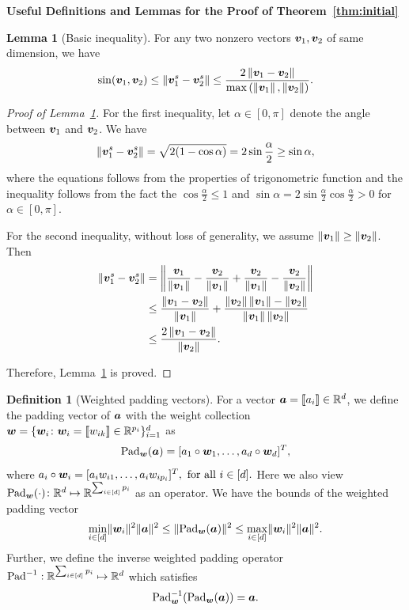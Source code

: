 \documentclass[journal]{IEEEtran}
\theoremstyle{definition}
\newtheorem{lem}{Lemma}
\theoremstyle{definition}
\newtheorem{defn}{Definition}
\begin{document}
{\bf Useful Definitions and Lemmas for the Proof of Theorem~\ref{thm:initial}} 

\begin{lem}[Basic inequality]\label{lem:norm_diff} For any two nonzero vectors $\bm{v}_1,\bm{v}_2$ of same dimension, we have 
\[
\sin(\bm{v}_1 , \bm{v}_2) \leq \left\lVert{\bm{v}_1^s}-{\bm{v}_2^s}\right\rVert\leq {2\left\lVert\bm{v}_1-\bm{v}_2\right\rVert\over \max\left(\left\lVert\bm{v}_1\right\rVert,\left\lVert\bm{v}_2\right\rVert\right)}.
\]
\end{lem}
\begin{proof}[Proof of Lemma~\ref{lem:norm_diff}]
For the first inequality, let $\alpha \in [0,\pi]$ denote the angle between $\bm{v}_1$ and $\bm{v}_2$. We have 
\begin{align}
     \left\lVert{\bm{v}_1^s}-{\bm{v}_2^s}\right\rVert = \sqrt{2(1 - \cos \alpha)} = 2 \sin \frac{\alpha}{2} \geq \sin \alpha,
\end{align}
where the equations follows from the properties of trigonometric function and the inequality follows from the fact the $\cos \frac{\alpha}{2} \leq 1$ and $\sin \alpha = 2 \sin \frac{\alpha}{2} \cos \frac{\alpha}{2} > 0$ for $\alpha \in [0, \pi]$. 

For the second inequality, without loss of generality, we assume $\left\lVert\bm{v}_1\right\rVert\geq \left\lVert\bm{v}_2\right\rVert$. Then
\begin{align}
\left\lVert{\bm{v}_1^s}-{\bm{v}_2^s}\right\rVert&=\left\lVert{\bm{v}_1\over \left\lVert\bm{v}_1\right\rVert}- {\bm{v}_2\over \left\lVert\bm{v}_1\right\rVert}+{\bm{v}_2\over \left\lVert\bm{v}_1\right\rVert}-{\bm{v}_2\over \left\lVert\bm{v}_2\right\rVert}\right\rVert\\
&\leq {\left\lVert\bm{v}_1-\bm{v}_2\right\rVert\over \left\lVert\bm{v}_1\right\rVert}+{\left\lVert\bm{v}_2\right\rVert\left\lVert\bm{v}_1\right\rVert-\left\lVert\bm{v}_2\right\rVert\over \left\lVert\bm{v}_1\right\rVert\left\lVert\bm{v}_2\right\rVert}\\
&\leq {2\left\lVert\bm{v}_1-\bm{v}_2\right\rVert\over \left\lVert\bm{v}_2\right\rVert}.
\end{align}

Therefore, Lemma~\ref{lem:norm_diff} is proved.
\end{proof}

\begin{defn}[Weighted padding vectors]\label{def:pad} For a vector $\bm{a} = \llbracket a_i \rrbracket \in \mathbb{R}^d$, we define the padding vector of $\bm{a}$ with the weight collection $\bm{w} = \{\bm{w}_i\colon \bm{w}_i = \llbracket w_{ik} \rrbracket \in \mathbb{R}^{p_i}\}_{i = 1}^d$ as
\begin{equation}\label{eq:paddef}
    \pad_{\mw}(\ma) = [a_1 \circ \mw_1, \ldots, a_d \circ \mw_d]^T, 
\end{equation}
where $ a_i \circ \bm{w}_i = [a_i w_{i1},\ldots, a_i w_{i p_i}]^T, \text{ for all } i \in [d].$
Here we also view $\text{Pad}_{\bm{w}}(\cdot)\colon \mathbb{R}^{d}\mapsto \mathbb{R}^{\sum_{i\in[d]}p_i}$ as an operator. 
We have the bounds of the weighted padding vector
\begin{equation}\label{eq:pad_bound}
     \min_{i \in [d]} \onormSize{}{\mw_i}^2 \onormSize{}{\ma}^2 \leq \onormSize{}{\pad_{\mw}(\ma)}^2 \leq \max_{i \in [d]} \onormSize{}{\mw_i}^2 \onormSize{}{\ma}^2.
\end{equation}
Further, we define the inverse weighted padding operator $\text{Pad}^{-1}: \mathbb{R}^{\sum_{i\in[d]}p_i}\mapsto \mathbb{R}^d$ which satisfies 
\begin{equation}
    \text{Pad}^{-1}_{\bm{w}}(\text{Pad}_{\bm{w}}(\bm{a})) = \bm{a}.
\end{equation}
\end{defn}
\end{document}
